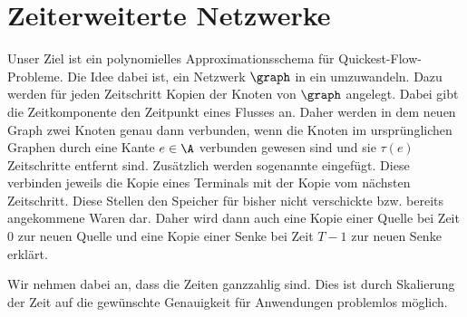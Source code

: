 \section{Zeiterweiterte Netzwerke}

Unser Ziel ist ein polynomielles Approximationsschema für Quickest-Flow-Probleme.
Die Idee dabei ist, ein Netzwerk $\graph$ in ein 
umzuwandeln. Dazu werden für jeden Zeitschritt Kopien der Knoten von $\graph$
angelegt. Dabei gibt die Zeitkomponente den Zeitpunkt eines Flusses an. Daher
werden in dem neuen Graph zwei Knoten genau dann verbunden, wenn die Knoten
im ursprünglichen Graphen durch eine Kante $e \in \A$ verbunden gewesen sind und
sie $\tau(e)$ Zeitschritte entfernt sind. Zusätzlich werden sogenannte
 eingefügt. Diese verbinden jeweils die Kopie eines
Terminals mit der Kopie vom nächsten Zeitschritt. Diese Stellen den Speicher
für bisher nicht verschickte bzw. bereits angekommene Waren dar.
Daher wird dann auch eine Kopie einer Quelle bei Zeit $0$ zur neuen Quelle
und eine Kopie einer Senke bei Zeit $T-1$ zur neuen Senke erklärt.

Wir nehmen dabei an, dass die Zeiten ganzzahlig sind. Dies ist durch Skalierung
der Zeit auf die gewünschte Genauigkeit für Anwendungen problemlos möglich.

